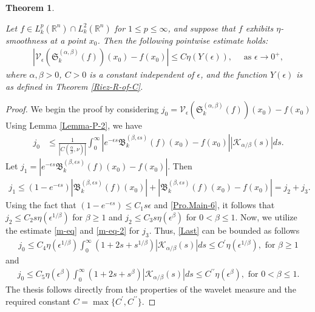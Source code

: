 \documentclass[11pt,a4paper,reqno]{amsproc}
\newtheorem{theorem}{Theorem}[section]
\theoremstyle{definition}
\theoremstyle{remark}
\numberwithin{equation}{section}
\begin{document}
\begin{theorem}\label{Rate-Pot}

Let $f \in L_k^p(\mathbb{R}^n)\cap L_k^2(\mathbb{R}^n)$ for $1\leq p \leq \infty$, and suppose that $f$ exhibits $\eta$-smoothness at a point $x_0$. Then the following pointwise estimate holds:
  \begin{align*}
      \left| \mathcal{V}_\epsilon\left( \mathfrak{S}_k^{(\alpha, \beta)}(f) \right)(x_0)-f(x_0) \right| \leq C\eta(Y(\epsilon)), \quad \text{ as $\epsilon \longrightarrow 0^+$}, 
  \end{align*}
  where $\alpha, \beta >0$, $C>0$ is a constant independent of $\epsilon$, and the function \(Y(\epsilon)\) is as defined in Theorem \ref{Riez-R-of-C}.
 \end{theorem}
\begin{proof}
    We begin the proof by considering $j_0 = \mathcal{V}_\epsilon\left( \mathfrak{S}_k^{(\alpha, \beta)}(f) \right)(x_0)-f(x_0)$
    Using Lemma \ref{Lemma-P-2}, we have
    \begin{align} \label{Last}
        j_0  &  \leq \frac{1}{\left| C\left(\frac{\alpha}{\beta},\nu\right) \right|} \int_0^\infty \left|e^{-\epsilon s}\mathfrak{B}_k^{(\beta, \epsilon s)}(f)(x_0)-f(x_0)\right| \left|\mathcal{K}_{\alpha/\beta}(s)\right|ds.
    \end{align}Let $j_1 = \left|e^{-\epsilon s}\mathfrak{B}_k^{(\beta, \epsilon s)}(f)(x_0)-f(x_0)\right|$. Then 
    \begin{align*}
        j_1 \leq (1 - e^{-\epsilon s}) 
        \left|\mathfrak{B}_k^{(\beta, \epsilon s)}(f) (x_0)\right|+
        \left|\mathfrak{B}_k^{(\beta, \epsilon s)}(f) (x_0) - f(x_0)\right| = j_2+j_3. \end{align*}
 Using the fact that $(1 - e^{-\epsilon s})\leq C_1s\epsilon$ and   \eqref{Pro.Main-6}, 
it follows that  $j_2 \leq C_2 s\eta(\epsilon^{1/\beta})$ for $\beta \geq 1$ and $j_2 \leq C_3 s\eta(\epsilon^{\beta})$ for $0<\beta \leq 1$.  Now, we utilize the estimate \eqref{m-eq} and \eqref{m-eq-2} for $j_3$. 
Thus, \eqref{Last} can be bounded as follows
\begin{align*}
    j_0 \leq  C_4 \eta(\epsilon^{1/\beta}) \int_0^\infty \left( 1+2s+s^{1/\beta} \right)  \left|\mathcal{K}_{\alpha/\beta}(s)\right|ds \leq C^\prime\eta(\epsilon^{1/\beta}), \text{ for $\beta \geq 1$}
\end{align*}
and 
\begin{align*}
    j_0 \leq  C_5 \eta(\epsilon^{\beta}) \int_0^\infty \left( 1+2s+s^{\beta} \right)  \left|\mathcal{K}_{\alpha/\beta}(s)\right|ds \leq C^{\prime \prime}\eta(\epsilon^{\beta}), \text{ for $0 < \beta \leq 1$}.
\end{align*}
The thesis follows directly from the properties of the wavelet measure and the required constant \( C= \max\{C^\prime, C^{\prime \prime} \}\).
\end{proof}
\end{document}
